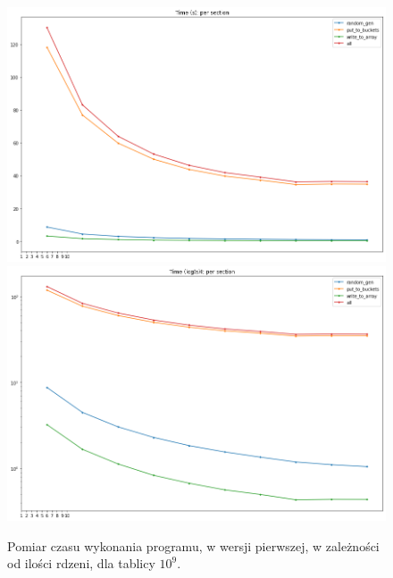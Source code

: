 \documentclass{article}
\begin{document}
        \begin{figure}[h!]
            \centering
            \includegraphics[width=17cm]{report2/images/Speedup/sam_time.png}
            \includegraphics[width=17cm]{report2/images/Speedup/sam_time_log.png}
            \caption{Pomiar czasu wykonania programu, w wersji pierwszej, w zależności od ilości rdzeni, dla tablicy ${10^{9}}$. }
        \end{figure}
\end{document}

